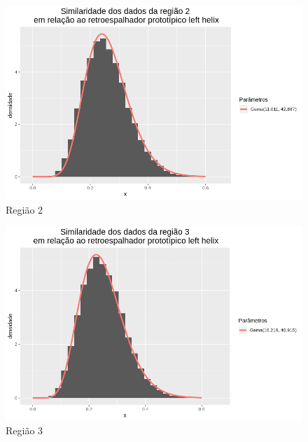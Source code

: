 \documentclass[12pt]{article}
\begin{document}
\begin{figure}[!h]
    \centering
    \vspace{0.1\linewidth}
    \includegraphics[width = \linewidth]{../../Images/Report_18_12_20/lh_region2.png}
    \caption{Região 2}
    \label{fig:lh_r2}
\end{figure}

\begin{figure}[!h]
    \centering
    \vspace{0.1\linewidth}
    \includegraphics[width = \linewidth]{../../Images/Report_18_12_20/lh_region3.png}
    \caption{Região 3}
    \label{fig:lh_r3}
\end{figure}
\end{document}

